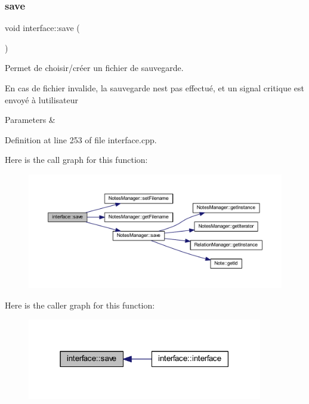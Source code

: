 \subsubsection{\texorpdfstring{save}{save}}
{\footnotesize\ttfamily void interface\+::save (\begin{DoxyParamCaption}{ }\end{DoxyParamCaption})\hspace{0.3cm}{\ttfamily [slot]}}



Permet de choisir/créer un fichier de sauvegarde. 

En cas de fichier invalide, la sauvegarde n\textquotesingle{}est pas effectué, et un signal critique est envoyé à l\textquotesingle{}utilisateur 
\begin{DoxyParams}{Parameters}
{\em } & \\
\hline
\end{DoxyParams}


Definition at line 253 of file interface.\+cpp.

Here is the call graph for this function\+:\nopagebreak
\begin{figure}[H]
\begin{center}
\leavevmode
\includegraphics[width=350pt]{classinterface_a319f133949e2be97a203f725c3f1e565_cgraph}
\end{center}
\end{figure}
Here is the caller graph for this function\+:\nopagebreak
\begin{figure}[H]
\begin{center}
\leavevmode
\includegraphics[width=291pt]{classinterface_a319f133949e2be97a203f725c3f1e565_icgraph}
\end{center}
\end{figure}
\mbox{\label{classinterface_aca23c755ba40ca8198010ff0487b22a8}} 
